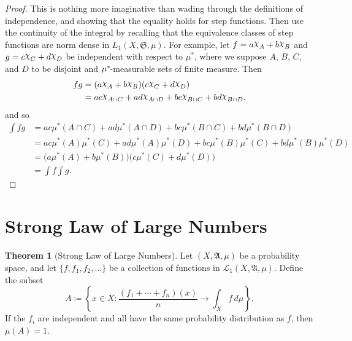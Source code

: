 \documentclass[
twoside=true,
paper=letter,
fontsize=11pt,
pagesize=auto,
leqno,
openany,
headsepline,
overfullrule,
]{scrbook}
\theoremstyle{plain}
\theoremstyle{plain}
\theoremstyle{definition}
\theoremstyle{bfnoteitalic}
\newtheorem{thmboldnote}[thm]{Theorem}
\theoremstyle{bfnoteroman}
\newcommand{\sigalg}[1]{\mathfrak{#1}}
\newcommand{\cali}[1]{\mathscr{#1}}
\newcommand{\definedby}{\coloneqq}
\newcommand{\charfunction}[1]{{\raisebox{2pt}{$\chi$}}_{#1}}
\newcommand{\meets}{\cap}
\newcommand{\semiring}{\sigalg{S}}
\newcommand{\sigmaalgebra}{\sigalg{A}}
\newcommand{\kernast}{\ast\kern-1pt}
\newcommand{\function}{f}
\newcommand{\functionii}{g}
\newcommand{\measurespace}{X}
\newcommand{\mspaceelt}{x}
\newcommand{\measure}{\mu}
\newcommand{\seti}{A}
\newcommand{\setii}{B}
\newcommand{\setiii}{C}
\newcommand{\setiv}{D}
\begin{document}
\begin{proof}
This is nothing more imaginative than wading through the definitions of independence,
and showing that the equality holds for step functions. Then use the continuity of the integral by recalling that the equivalence classes of step functions are norm dense in 
$L_1(\measurespace, \semiring,\measure)$.
For example, let 
$\function = a\charfunction{\seti} + b\charfunction{\setii}$ and 
$\functionii = c\charfunction{\setiii} + d\charfunction{\setiv}$ be independent with respect to $\measure^*$,
where we suppose $\seti$, $\setii$, $\setiii$, and $\setiv$ to be disjoint and $\measure^\kernast$-measurable sets of finite measure. Then
\begin{align*}
\function\functionii 
& =
(a\charfunction{\seti} + b\charfunction{\setii})
(c\charfunction{\setiii} + d\charfunction{\setiv}) \\
& = ac\charfunction{\seti\meets\setiii}
+ ad\charfunction{\seti\meets\setiv}
+ bc\charfunction{\setii\meets\setiii}
+ bd\charfunction{\setii\meets\setiv},
\end{align*}
and so 
\begin{align*}
\int fg 
& = ac\measure^*(\seti\meets\setiii)
+ ad\measure^*(\seti\meets\setiv)
+ bc\measure^*(\setii\meets\setiii)
+ bd\measure^*(\setii\meets\setiv)\\
& = ac\measure^*(\seti)\measure^*(\setiii)
+ ad\measure^*(\seti)\measure^*(\setiv)
+ bc\measure^*(\setii)\measure^*(\setiii)
+ bd\measure^*(\setii)\measure^*(\setiv)\\
& = \bigl(a\measure^*(\seti) + b\measure^*(\setii)\bigr)
\bigl(c\measure^*(\setiii) + d\measure^*(\setiv)\bigr) \\
& = \int \function \int \functionii.
\end{align*}
\end{proof}




\section{Strong Law of Large Numbers}
\begin{thmboldnote}[Strong Law of Large Numbers]\label{large_numbers}
Let $(\measurespace,\sigmaalgebra,\measure)$ be a probability space, and let
$\{\function, \function_1,\function_2,\ldots\}$ be a collection of functions in  $\cali{L}_1(\measurespace,\sigmaalgebra,\measure)$. Define the subset
\[
\seti \definedby
\left\{ \mspaceelt\in\measurespace : 
\frac{(\function_1 + \cdots + \function_n)(\mspaceelt)}{n}
\to 
\int_\measurespace \function \, d\measure
\right\}.
\]
If the $\function_i$ are independent and all have the same probability distribution as $\function$, then 
$\measure(\seti) = 1$.
\end{thmboldnote}
\end{document}
